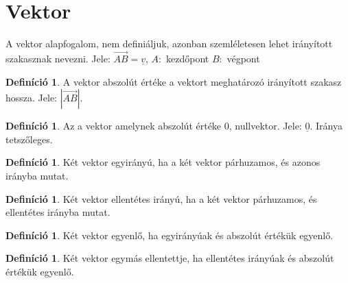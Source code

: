 \documentclass[twoside,12pt]{report}
\renewcommand{\vec}{\underline}
\theoremstyle{definition}
\newtheorem{definition}[theorem]{Definíció}
\begin{document}
\section{Vektor}
	A vektor alapfogalom, nem definiáljuk, azonban szemléletesen lehet irányított szakasznak nevezni. Jele: $\overrightarrow{AB}=\vec{v}$, $A:$ kezdőpont $B:$ végpont
	\begin{definition}
		A vektor abszolút értéke a vektort meghatározó irányított szakasz hossza. Jele: $|\overrightarrow{AB}|$.
	\end{definition}
	\begin{definition}
		Az a vektor amelynek abszolút értéke 0, nullvektor. Jele: $\vec{0}$. Iránya tetszőleges.
	\end{definition}
	\begin{definition}
		Két vektor egyirányú, ha a két vektor párhuzamos, és azonos irányba mutat.
	\end{definition}
	\begin{definition}
		Két vektor ellentétes irányú, ha a két vektor párhuzamos, és ellentétes irányba mutat.
	\end{definition}
	\begin{definition}
		Két vektor egyenlő, ha egyirányúak és abszolút értékük egyenlő.
	\end{definition}
	\begin{definition}
		Két vektor egymás ellentettje, ha ellentétes irányúak és abszolút értékük egyenlő.
	\end{definition}
\end{document}

